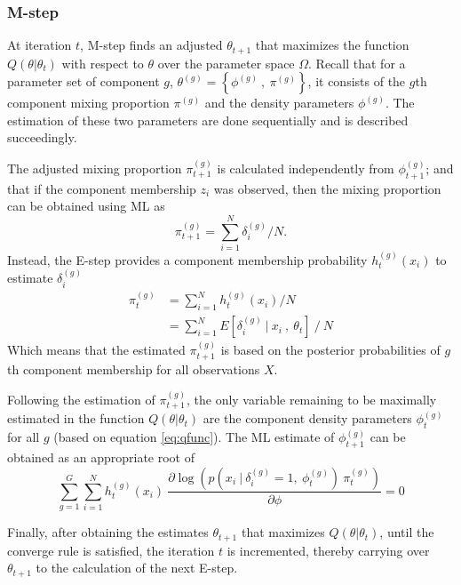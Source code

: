 \subsubsection{M-step}
\label{sec:mstep}
At iteration $t$, M-step finds an adjusted $\theta_{t+1}$ that maximizes the function $\displaystyle Q( \theta |\theta _{t})$ with respect to $\theta$ over the parameter space $\Omega$. Recall that for a parameter set of component $g$, $\displaystyle \theta ^{( g)} =\left\{\phi ^{( g)} \ ,\ \pi ^{( g)}\right\}$, it consists of the  $g$th component mixing proportion $\pi^{( g)}$ and the density parameters $\phi^{( g)}$. The estimation of these two parameters are done sequentially and is described succeedingly.

The adjusted mixing proportion $\displaystyle \pi^{(g)}_{t+1}$ is calculated independently from $\displaystyle \phi ^{( g)}_{t+1}$; and that if the component membership \(z_i\) was observed, then the mixing proportion can be obtained using ML as 
\[\pi^{(g)}_{t+1}=\sum_{i=1}^{N}\delta_{i}^{(g)}/N.\]
Instead, the E-step provides a component membership probability $h^{(g)}_{t}(x_{i})$ to estimate $\delta_{i}^{(g)}$
\begin{equation*}
    \begin{aligned}
    \pi^{(g)}_{t} & =\sum ^{N}_{i=1} h^{( g)}_{t}( x_{i}) /N\\
     & =\sum ^{N}_{i=1} E\left[ \delta ^{( g)}_{i} \ |\ x_{i} \ ,\ \theta _{t}\right] \ /\ N
    \end{aligned}
\end{equation*}
Which means that the estimated $\pi^{(g)}_{t+1}$ is based on the posterior probabilities of $g$th component membership for all observations $X$.

Following the estimation of $\displaystyle \pi^{(g)}_{t+1}$, the only variable remaining to be maximally estimated in the function $Q(\theta | \theta_t)$ are the component density parameters $\phi^{(g)}_t$ for all $g$ (based on equation \ref{eq:qfunc}). The ML estimate of $\phi^{(g)}_{t+1}$ can be obtained as an appropriate root of 
\begin{equation*}
    \sum ^{G}_{g=1}\sum ^{N}_{i=1} h^{( g)}_{t}( x_{i}) \ \frac{\partial \log\left( p\left( x_{i} \ |\ \delta ^{( g)}_{i} =1,\ \phi ^{( g)}_{t}\right) \ \pi ^{( g)}_{t}\right)}{\partial \phi } =0
\end{equation*}

Finally, after obtaining the estimates $\theta_{t+1}$ that maximizes $Q(\theta|\theta_t)$, until the converge rule is satisfied, the iteration $t$ is incremented, thereby carrying over $\theta_{t+1}$ to the calculation of the next E-step.

